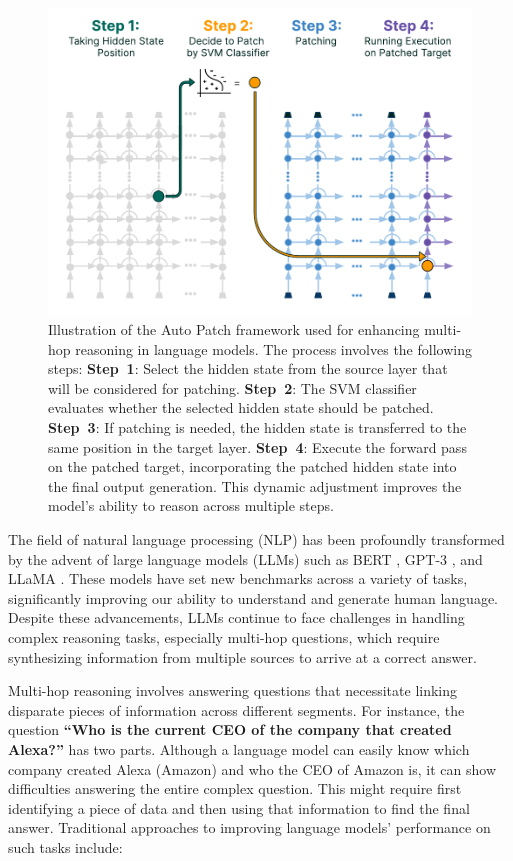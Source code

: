 \documentclass[11pt]{article}
\begin{document}
\begin{figure}[!ht]
    \centering
    \includegraphics[width=\columnwidth]{figures/autopatch.pdf}
    \vspace{-.5cm}
    \caption{Illustration of the Auto Patch framework used for enhancing multi-hop reasoning in language models. The process involves the following steps:
    \textbf{Step~1}: Select the hidden state from the source layer that will be considered for patching.
    \textbf{Step~2}: The SVM classifier evaluates whether the selected hidden state should be patched.
    \textbf{Step~3}: If patching is needed, the hidden state is transferred to the same position in the target layer.
    \textbf{Step~4}: Execute the forward pass on the patched target, incorporating the patched hidden state into the final output generation. This dynamic adjustment improves the model's ability to reason across multiple steps.}
    \label{fig:autopatch}
\end{figure}


The field of natural language processing (NLP) has been profoundly transformed by the advent of large language models (LLMs) such as BERT \cite{devlin2019bert}, GPT-3 \cite{brown2020language}, and LLaMA \cite{touvron2023llama}. These models have set new benchmarks across a variety of tasks, significantly improving our ability to understand and generate human language. Despite these advancements, LLMs continue to face challenges in handling complex reasoning tasks, especially multi-hop questions, which require synthesizing information from multiple sources to arrive at a correct answer.

Multi-hop reasoning involves answering questions that necessitate linking disparate pieces of information across different segments. For instance, the question \textbf{``Who is the current CEO of the company that created Alexa?''} has two parts. Although a language model can easily know which company created Alexa (Amazon) and who the CEO of Amazon is, it can show difficulties answering the entire complex question. This might require first identifying a piece of data and then using that information to find the final answer. Traditional approaches to improving language models' performance on such tasks include:
\end{document}
